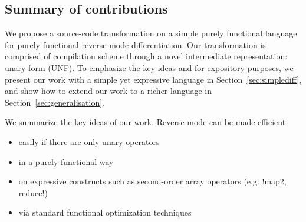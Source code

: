 
\subsection{Summary of contributions}

We propose a source-code transformation on a simple purely functional language for purely functional reverse-mode differentiation.
Our transformation is comprised of compilation scheme through a novel intermediate representation: unary form (UNF).
To emphasize the key ideas and for expository purposes, we present our work with a simple yet expressive language in Section~\ref{sec:simplediff}, 
and show how to extend our work to a richer language in Section~\ref{sec:generalisation}.

We summarize the key ideas of our work. Reverse-mode can be made efficient
\begin{itemize}
   \item easily if there are only unary operators
   \item in a purely functional way
   \item on expressive constructs such as second-order array operators (e.g. !map2, reduce!) 
   \item via standard functional optimization techniques
\end{itemize}

